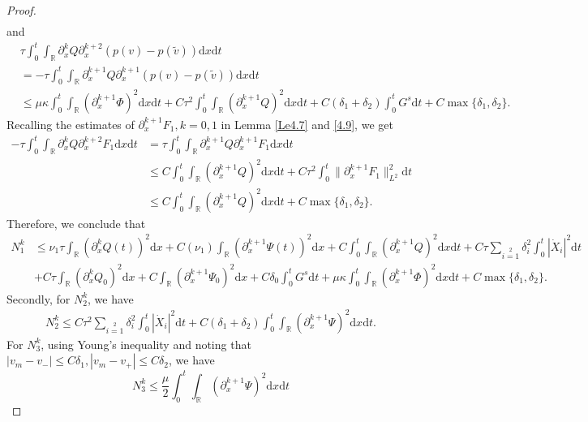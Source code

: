 \documentclass[10pt,reqno]{amsart}
\numberwithin{equation}{section}
\newcommand{\dif}{\mathrm{d}}
\begin{document}
\begin{proof}
\begin{align*}
\end{align*}
and
\begin{align*}
&\tau\int_0^t\int_\mathbb{R}\partial_{x}^kQ\partial_{x}^{k+2}(p(v)-p(\widetilde{v}))\dif x \dif t\\
&=-\tau\int_0^t\int_\mathbb{R}\partial_{x}^{k+1}Q\partial_{x}^{k+1}(p(v)-p(\widetilde{v}))\dif x \dif t\\
&\le \mu\kappa\int_0^t\int_\mathbb{R}\left(\partial_{x}^{k+1}\Phi\right)^2\dif x \dif t
+C\tau^2\int_0^t\int_\mathbb{R}\left(\partial_{x}^{k+1}Q\right)^2\dif x \dif t
+C(\delta_1+\delta_2)\int_0^tG^s\dif t
+C\max\{\delta_1,\delta_2\}.
\end{align*}
Recalling the estimates of $\partial_x^{k+1} F_1, k=0, 1$ in Lemma \ref{Le4.7} and \eqref{4.9}, we get
\begin{align*}
-\tau\int_0^t\int_\mathbb{R}\partial_{x}^kQ
      \partial_{x}^{k+2}F_1 \dif x \dif t&=\tau\int_0^t\int_\mathbb{R}\partial_{x}^{k+1}Q
      \partial_{x}^{k+1}F_1 \dif x \dif t\\
     & \leq C\int_0^t\int_\mathbb{R}\left(\partial_{x}^{k+1}Q\right)^2
       \dif x \dif t+C\tau^2\int_0^t\|\partial_{x}^{k+1}F_1\|_{L^2}^2\dif t\\
      &\leq C\int_0^t\int_\mathbb{R}\left(\partial_{x}^{k+1}Q\right)^2
       \dif x \dif t+C\max\{\delta_1,\delta_2\}.
\end{align*}
Therefore, we conclude that
\begin{align*}
N_1^k&\le\nu_1\tau\int_\mathbb{R}\left(\partial_{x}^kQ(t)\right)^2\dif x
+C(\nu_1)\int_\mathbb{R}\left(\partial_{x}^{k+1}\Psi(t)\right)^2\dif x
+C\int_0^t\int_\mathbb{R}\left(\partial_{x}^{k+1}Q\right)^2\dif x \dif t
+C\tau\sum\limits_{i=1}\limits^2\delta_i^2\int_0^t|\dot{X}_i|^2\dif t\\
&+C\tau\int_\mathbb{R}\left(\partial_{x}^kQ_0\right)^2\dif x
+C\int_\mathbb{R}\left(\partial_{x}^{k+1}\Psi_0\right)^2\dif x
+C\delta_0\int_0^tG^s\dif t+\mu\kappa\int_0^t\int_\mathbb{R}\left(\partial_{x}^{k+1}\Phi\right)^2\dif x \dif t
+C\max\{\delta_1,\delta_2\}.
\end{align*}
Secondly, for $N_2^k$, we have
\begin{align*}
N_2^k\leq C\tau^2\sum\limits_{i=1}\limits^2\delta_i^2\int_0^t|\dot{X}_i|^2\dif t
+C(\delta_1+\delta_2)\int_0^t\int_\mathbb{R}\left(\partial_{x}^{k+1}\Psi\right)^2\dif x \dif t.
\end{align*}
For $N_3^k$, using Young's inequality and noting that $|v_m-v_-|\le C\delta_1, |v_m-v_+|\le C\delta_2$, we have
\[
N_3^k\leq \frac{\mu}{2}\int_0^t\int_{\mathbb{R}}\left(\partial_{x}^{k+1}\Psi\right)^2\dif x \dif t
\]
\end{proof}
\end{document}

